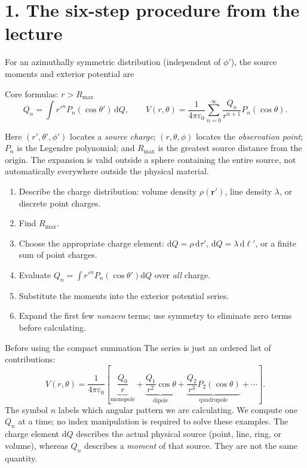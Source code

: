 \documentclass[10pt,letterpaper]{article}
\newcommand{\eps}{\varepsilon_0}\newcommand{\dd}{\mathrm d}
\begin{document}
\section*{1. The six-step procedure from the lecture}
For an azimuthally symmetric distribution (independent of $\phi'$), the source moments and exterior potential are
\begin{result}{Core formulas: $r>R_{\max}$}
\[\boxed{Q_n=\int r'^nP_n(\cos\theta')\,\dd Q},\qquad\boxed{V(r,\theta)=\frac{1}{4\pi\eps}\sum_{n=0}^\infty\frac{Q_n}{r^{n+1}}P_n(\cos\theta)}.\]
\end{result}
Here $(r',\theta',\phi')$ locates a \emph{source charge}; $(r,\theta,\phi)$ locates the \emph{observation point}; $P_n$ is the Legendre polynomial; and $R_{\max}$ is the greatest source distance from the origin. The expansion is valid outside a sphere containing the entire source, not automatically everywhere outside the physical material.
\begin{enumerate}[label=\textbf{Step \arabic*.},itemsep=3pt]
\item Describe the charge distribution: volume density $\rho(\mathbf r')$, line density $\lambda$, or discrete point charges.
\item Find $R_{\max}$.
\item Choose the appropriate charge element: $\dd Q=\rho\,\dd\tau'$, $\dd Q=\lambda\,\dd\ell'$, or a finite sum of point charges.
\item Evaluate $Q_n=\int r'^nP_n(\cos\theta')\dd Q$ over \emph{all} charge.
\item Substitute the moments into the exterior potential series.
\item Expand the first few \emph{nonzero} terms; use symmetry to eliminate zero terms before calculating.
\end{enumerate}
\begin{insight}{Before using the compact summation}
The series is just an ordered list of contributions:
\[V(r,\theta)=\frac{1}{4\pi\eps}\left[\underbrace{\frac{Q_0}{r}}_{\text{monopole}}+\underbrace{\frac{Q_1}{r^2}\cos\theta}_{\text{dipole}}+\underbrace{\frac{Q_2}{r^3}P_2(\cos\theta)}_{\text{quadrupole}}+\cdots\right].\]
The symbol $n$ labels which angular pattern we are calculating. We compute one $Q_n$ at a time; no index manipulation is required to solve these examples. The charge element $\dd Q$ describes the actual physical source (point, line, ring, or volume), whereas $Q_n$ describes a \emph{moment} of that source. They are not the same quantity.
\end{insight}
\end{document}

